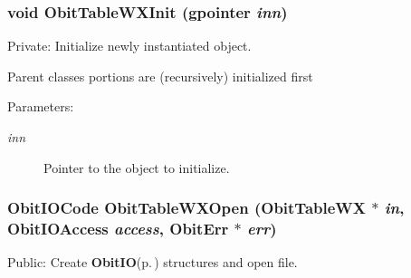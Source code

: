 \subsubsection{\setlength{\rightskip}{0pt plus 5cm}void Obit\-Table\-WXInit (gpointer {\em inn})}\label{ObitTableWX_8c_a8}


Private: Initialize newly instantiated object. 

Parent classes portions are (recursively) initialized first \begin{Desc}
\item[Parameters:]
\begin{description}
\item[{\em inn}]Pointer to the object to initialize. \end{description}
\end{Desc}
\subsubsection{\setlength{\rightskip}{0pt plus 5cm}Obit\-IOCode Obit\-Table\-WXOpen ({\bf Obit\-Table\-WX} $\ast$ {\em in}, Obit\-IOAccess {\em access}, {\bf Obit\-Err} $\ast$ {\em err})}\label{ObitTableWX_8c_a21}


Public: Create {\bf Obit\-IO}{\rm (p.\,\pageref{structObitIO})} structures and open file. 

